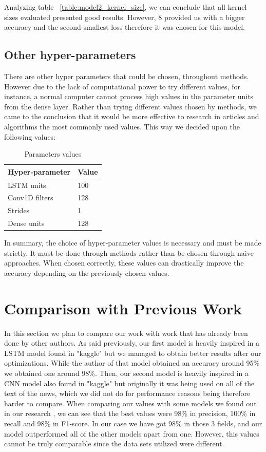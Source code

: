 \documentclass[conference]{IEEEtran}
\newcommand\tab[1][0.4cm]{\hspace*{#1}}
\begin{document}
Analyzing table ~\ref{table:model2_kernel_size}, we can conclude that all kernel sizes evaluated presented good results. However, 8 provided us with a bigger accuracy and the second smallest loss therefore it was chosen for this model.

\subsection{Other hyper-parameters}
There are other hyper parameters that could be chosen, throughout methods. However due to the lack of computational power to try different values, for instance, a normal computer cannot process high values in the parameter units from the dense layer. Rather than trying different values chosen by methods, we came to the conclusion that it would be more effective to research in articles and algorithms the most commonly used values. This way we decided upon the following values:

\begin{table}[H]
\centering
\caption{Parameters values}
\begin{tabular}{ | m{7em} | m{1cm} | } 
\hline
Hyper-parameter & Value\\
\hline
LSTM units & 100 \\
\hline
Conv1D filters & 128\\
\hline
Strides & 1 \\
\hline
Dense units & 128 \\

\hline
\end{tabular}
\end{table}

In summary, the choice of hyper-parameter values is necessary and must be made strictly. It must be done through methods rather than be chosen through naive approaches. When chosen correctly, these values can drastically improve the accuracy depending on the previously chosen values.

\section{Comparison with Previous Work}
In this section we plan to compare our work with work that has already been done by other authors. As said previously, our first model is heavily inspired in a LSTM model found in "kaggle" but we managed to obtain better results after our optimizations. While the author of that model obtained an accuracy around 95\% we obtained one around 98\%. Then, our second model is heavily inspired in a CNN model also found in "kaggle" but originally it was being used on all of the text of the news, which we did not do for performance reasons being therefore harder to compare.
\linebreak
\tab When comparing our values with some models we found out in our research \cite{I}, we can see that the best values were 98\% in precision, 100\% in recall and 98\% in F1-score. In our case we have got 98\% in those 3 fields, and our model outperformed all of the other models apart from one. However, this values cannot be truly comparable since the data sets utilized were different.
\end{document}
